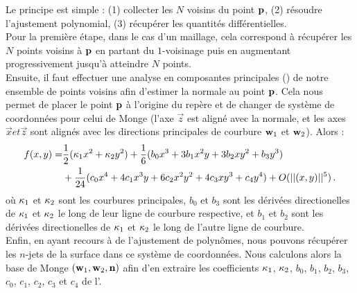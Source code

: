 Le principe est simple : (1) collecter les $N$ voisins du point $\mathbf{p}$, (2)
résoudre l'ajustement polynomial, (3) récupérer les quantités différentielles.
%
\\
%
Pour la première étape, dans le cas d'un maillage, cela correspond à récupérer
les $N$ points voisins à $\mathbf{p}$ en partant du $1$-voisinage puis en augmentant
progressivement jusqu'à atteindre $N$ points.
%
\\
%
Ensuite, il faut effectuer une analyse en composantes principales (\ACP) de
notre ensemble de points voisins afin d'estimer la normale au point $\mathbf{p}$. Cela
nous permet de placer le point $\mathbf{p}$ à l'origine du repère et de changer de
système de coordonnées pour celui de Monge (l'axe $\vec{z}$ est aligné avec la
normale, et les axes $\vec{x} et \vec{z}$ sont alignés avec les directions
principales de courbure $\mathbf{w}_{1}$ et $\mathbf{w}_{2}$). Alors :
%
\begin{align} \label{eq:monge}
  f(x,y) = & \frac{1}{2}(\kappa_{1}x^2 + \kappa_{2}y^2)+ \frac{1}{6}(b_0x^3+3b_1x^2y+3b_2xy^2+b_3y^3) \\ & +\frac{1}{24}(c_0x^4+4c_1x^3y+6c_2x^2y^2+4c_3xy^3+c_4y^4) + O(||(x,y)||^{5}) \,.
\end{align}
%
où $\kappa_{1}$ et $\kappa_{2}$ sont les courbures principales, $b_0$ et
$b_3$ sont les dérivées directionelles de $\kappa_{1}$ et $\kappa_{2}$ le
long de leur ligne de courbure respective, et $b_1$ et $b_2$ sont les dérivées
directionelles de $\kappa_{1}$ et $\kappa_{2}$ le long de l'autre ligne de
courbure.
%
\\
%
Enfin, en ayant recours à de l'ajustement de polynômes, nous pouvons récupérer
les $n$-jets de la surface dans ce système de coordonnées. Nous calculons alors
la base de Monge $(\mathbf{w}_{1}, \mathbf{w}_{2}, \mathbf{n})$ afin d'en extraire
les coefficients $\kappa_{1}$, $\kappa_{2}$, $b_0$, $b_1$, $b_2$, $b_3$,
$c_0$, $c_1$, $c_2$, $c_3$ et $c_4$ de l'.


